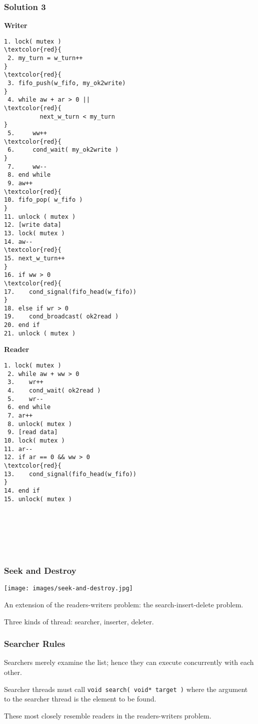 \begin{frame}[fragile]
	\frametitle{Solution 3}

	\begin{multicols}{2}
		\footnotesize
		\textbf{Writer}
		\begin{Verbatim}[commandchars=\\\{\}]
 1. lock( mutex )
\textcolor{red}{
 2. my_turn = w_turn++
}
\textcolor{red}{
 3. fifo_push(w_fifo, my_ok2write)
}
 4. while aw + ar > 0 ||
\textcolor{red}{
          next_w_turn < my_turn
}
 5.     ww++
\textcolor{red}{
 6.     cond_wait( my_ok2write )
}
 7.     ww--
 8. end while
 9. aw++
\textcolor{red}{
10. fifo_pop( w_fifo )
}
11. unlock ( mutex )
12. [write data]
13. lock( mutex )
14. aw--
\textcolor{red}{
15. next_w_turn++
}
16. if ww > 0
\textcolor{red}{
17.    cond_signal(fifo_head(w_fifo))
}
18. else if wr > 0
19.    cond_broadcast( ok2read )
20. end if
21. unlock ( mutex )
    \end{Verbatim}
    \columnbreak
    \textbf{Reader}
    \begin{Verbatim}[commandchars=\\\{\}]
 1. lock( mutex )
 2. while aw + ww > 0
 3.    wr++
 4.    cond_wait( ok2read )
 5.    wr--
 6. end while
 7. ar++
 8. unlock( mutex )
 9. [read data]
10. lock( mutex )
11. ar--
12. if ar == 0 && ww > 0
\textcolor{red}{
13.    cond_signal(fifo_head(w_fifo))
}
14. end if
15. unlock( mutex )







    \end{Verbatim}
\end{multicols}
\vspace{-2em}

\end{frame}


\begin{frame}
	\frametitle{Seek and Destroy}

	\begin{center}
		\texttt{[image: images/seek-and-destroy.jpg]}
	\end{center}
	An extension of the readers-writers problem: the search-insert-delete problem.

	Three kinds of thread: searcher, inserter, deleter.

\end{frame}


\begin{frame}
	\frametitle{Searcher Rules}

	\alert{Searchers} merely examine the list; hence they can execute concurrently with each other.

	Searcher threads must call \texttt{void search( void* target )} where the argument to the searcher thread is the element to be found.

	These most closely resemble readers in the readers-writers problem.

\end{frame}

